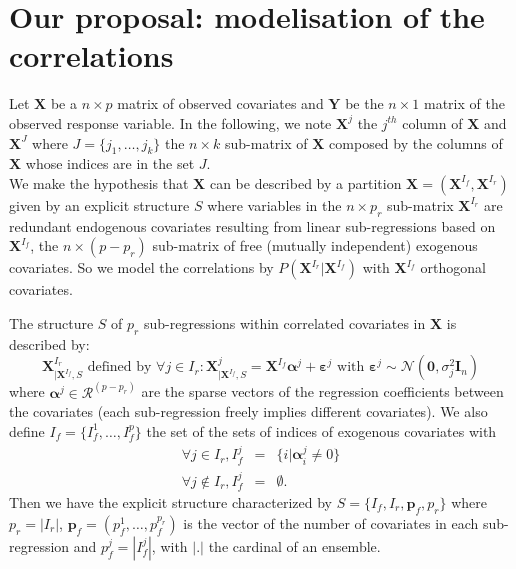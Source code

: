 \documentclass[12pt,a4paper]{report}
\begin{document}
\section{Our proposal: modelisation of the correlations}
	Let $\boldsymbol{X}$ be a $n \times p$ matrix of observed covariates and $\boldsymbol{Y}$ be the $n \times 1$ matrix of the observed response variable. In the following, we note $\boldsymbol{X}^j$ the $j^{th}$ column of $\boldsymbol{X}$ and $\boldsymbol{X}^{J}$ where $J=\{j_1,\dots,j_k\}$ the $n\times k$ sub-matrix of $\boldsymbol{X}$ composed by the columns of $\boldsymbol{X}$ whose indices are in the set $J$. 
\\

We make the hypothesis that $\boldsymbol{X}$ can be described by a partition $\boldsymbol{X}=(\boldsymbol{X}^{I_f},\boldsymbol{X}^{I_r}) $ given by an explicit structure $S$ where variables in the $n\times p_r$ sub-matrix $\boldsymbol{X}^{I_r}$ are redundant endogenous covariates resulting from linear sub-regressions based on $\boldsymbol{X}^{I_f}$, the  $n\times (p-p_r)$ sub-matrix of free (mutually independent) exogenous covariates.
So we model the correlations by $P(\boldsymbol{X}^{I_r}|\boldsymbol{X}^{I_f}) $ with $\boldsymbol{X}^{I_f}$ orthogonal covariates.
 
 

The structure $S$ of $p_r$ sub-regressions within correlated covariates in $\boldsymbol{X}$ is described by:
	\begin{equation}
		\boldsymbol{X}^{I_r}_{|\boldsymbol{X}^{I_f},S} \textrm{ defined by }\forall j \in I_r: \boldsymbol{X}^j_{|\boldsymbol{X}^{I_f},S}=\boldsymbol{X}^{I_f}\boldsymbol{\alpha}^j+\boldsymbol{\varepsilon}^j \textrm{ with } \boldsymbol{\varepsilon}^j \sim\mathcal{N}(\boldsymbol{0},\sigma^2_j\boldsymbol{I}_n) \label{SR}
	\end{equation}
		where $\boldsymbol{\alpha}^j \in \mathcal{R}^{(p-p_r)}$ are the sparse vectors of the regression coefficients between the covariates (each sub-regression freely implies different covariates). 
We also define $I_f=\{I_f^1,\dots,I_f^p \}$ the set of the sets of indices of exogenous covariates with
\begin{eqnarray}
	\forall j \in I_r, I_f^j&=&\{i|\boldsymbol{\alpha}^j_i\neq 0 \} \\
	\forall j \notin I_r, I_f^j&=&\emptyset .
\end{eqnarray}
Then we have the explicit structure characterized by $S=\{I_f,I_r,\boldsymbol{p}_f,p_r\}$ where $p_r=|I_r|$, $\boldsymbol{p}_f=(p_f^1,\dots,p_f^{p_r})$ is the vector of the number of covariates in each sub-regression  and $p_f^j=|I_f^j|$, with $|.|$ the cardinal of an ensemble. 
\\
\\
\end{document}
